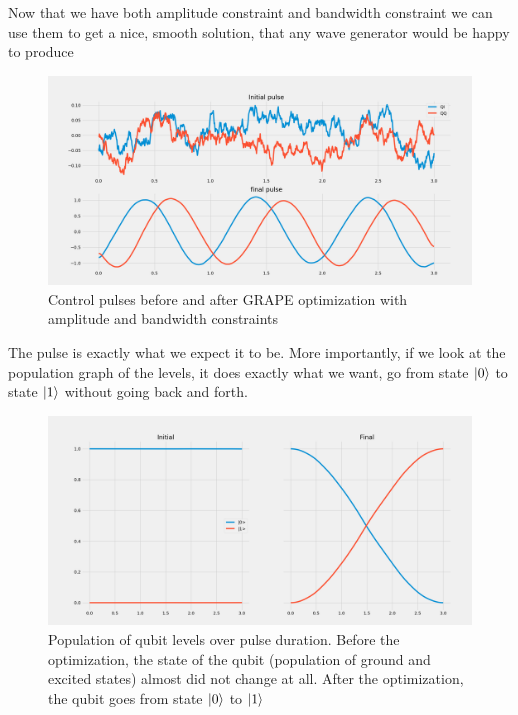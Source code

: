
Now that we have both amplitude constraint and bandwidth constraint we can use them to get a nice, smooth solution, that any wave generator would be happy to produce
\begin{figure}[H]
    \centering
    \includegraphics[width=1\columnwidth]{Results/qubit-band-amp-const/pulses.png}
    \caption{Control pulses before and after GRAPE optimization with amplitude and bandwidth constraints}
    \label{fig:band-amp-const-qubit}
\end{figure}
The pulse is exactly what we expect it to be. More importantly, if we look at the population graph of the levels, it does exactly what we want, go from state $\ket{0}$ to state $\ket{1}$ without going back and forth.
\begin{figure}[H]
    \centering
    \includegraphics[width=1\columnwidth]{Results/qubit-band-amp-const/level-population.png}
    \caption{Population of qubit levels over pulse duration. Before the optimization, the state of the qubit (population of ground and excited states) almost did not change at all. After the optimization, the qubit goes from state $\ket{0}$ to $\ket{1}$}
    \label{fig:band-amp-const-level-population}
\end{figure}

